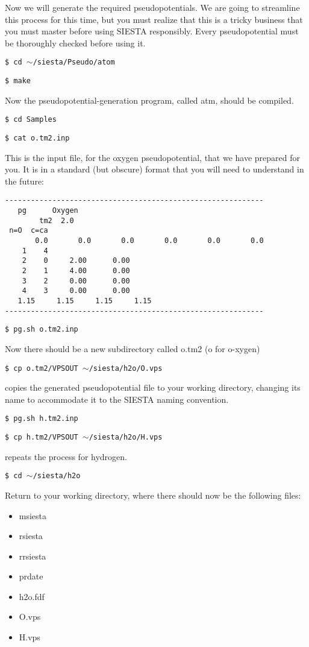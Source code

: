 Now we will generate the required pseudopotentials.
We are going to streamline this process for this time, but
you must realize that this is a tricky business that you 
must master before using SIESTA responsibly. Every 
pseudopotential must be thoroughly checked before using it.

{\tt \$ cd $\sim$/siesta/Pseudo/atom}

{\tt \$ make}

\noindent
Now the pseudopotential-generation program, called atm, 
should be compiled.

{\tt \$ cd Samples}

{\tt \$ cat o.tm2.inp}

\noindent
This is the input file, for the oxygen pseudopotential, 
that we have prepared for you. 
It is in a standard (but obscure) format that
you will need to understand in the future:
\begin{verbatim}
------------------------------------------------------------
   pg      Oxygen
        tm2  2.0
 n=O  c=ca 
       0.0       0.0       0.0       0.0       0.0       0.0
    1    4
    2    0     2.00      0.00
    2    1     4.00      0.00
    3    2     0.00      0.00
    4    3     0.00      0.00
   1.15     1.15     1.15     1.15
------------------------------------------------------------
\end{verbatim}

{\tt \$ pg.sh o.tm2.inp}

\noindent
Now there should be a new subdirectory called o.tm2 (o for o-xygen)

{\tt \$ cp o.tm2/VPSOUT $\sim$/siesta/h2o/O.vps}

\noindent
copies the generated pseudopotential file to your working directory, 
changing its name to accommodate it to the SIESTA naming convention.

{\tt \$ pg.sh h.tm2.inp}

{\tt \$ cp h.tm2/VPSOUT $\sim$/siesta/h2o/H.vps}

\noindent
repeats the process for hydrogen.

{\tt \$ cd $\sim$/siesta/h2o}

\noindent
Return to your working directory, where there should now be
the following files:
\begin{itemize}
\item msiesta
\item rsiesta
\item rrsiesta
\item prdate
\item h2o.fdf
\item O.vps
\item H.vps
\end{itemize}

